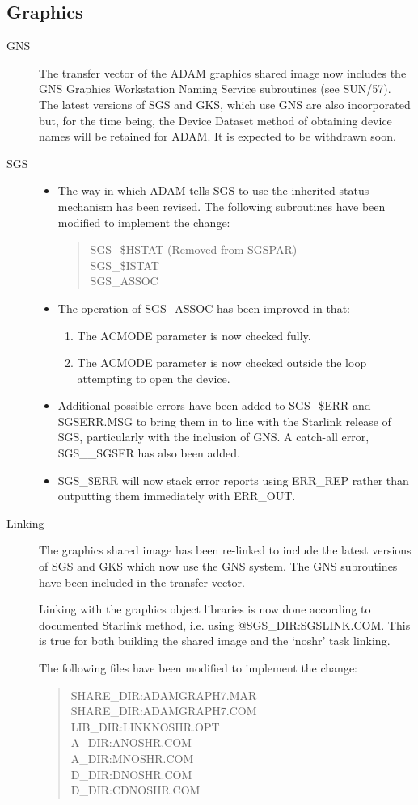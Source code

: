 \subsection{Graphics}
\begin{description}
\item[GNS]
The transfer vector of the ADAM graphics shared image now includes the GNS
Graphics Workstation Naming Service subroutines (see SUN/57).
The latest versions of SGS and GKS, which use GNS are also incorporated but,
for the time being, the Device Dataset method of obtaining device names will
be retained for ADAM.
It is expected to be withdrawn soon.

\item[SGS]
\begin{itemize}
\item The way in which ADAM tells SGS to use the inherited status mechanism 
has been revised.
The following subroutines have been modified to implement the change:
\begin{quote}
SGS\_\$HSTAT (Removed from SGSPAR)\\
SGS\_\$ISTAT\\
SGS\_ASSOC
\end{quote}
\item The operation of SGS\_ASSOC has been improved in that:
\begin{enumerate}
\item The ACMODE parameter is now checked fully.
\item The ACMODE parameter is now checked outside the loop attempting to open
the device.
\end{enumerate}
\item Additional possible errors have been added to SGS\_\$ERR and SGSERR.MSG
to bring them in to line with the Starlink release of SGS, particularly with
the inclusion of GNS.
A catch-all error, SGS\_\_SGSER has also been added.
\item SGS\_\$ERR will now stack error reports using ERR\_REP rather than 
outputting them immediately with ERR\_OUT.
\end{itemize}

\item[Linking]
The graphics shared image has been re-linked to include the latest versions
of SGS and GKS which now use the GNS system.
The GNS subroutines have been included in the transfer vector.

Linking with the graphics object libraries is now done according to documented
Starlink method, i.e. using @SGS\_DIR:SGSLINK.COM. 
This is true for both building the shared image and the `noshr' task linking.

The following files have been modified to implement the change:
\begin{quote}
SHARE\_DIR:ADAMGRAPH7.MAR\\
SHARE\_DIR:ADAMGRAPH7.COM\\
LIB\_DIR:LINKNOSHR.OPT\\
A\_DIR:ANOSHR.COM\\
A\_DIR:MNOSHR.COM\\
D\_DIR:DNOSHR.COM\\
D\_DIR:CDNOSHR.COM
\end{quote}
\end{description}

